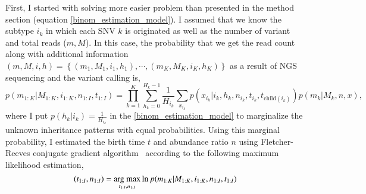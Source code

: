 \documentclass{article}
\begin{document}




First, I started with solving more easier problem than presented in the method section (equation \ref{binom_estimation_model}).
I assumed that we know the subtype $i_k$ in which each SNV $k$ is originated as well as the number of variant and total reads ($m, M$).
In this case, the probability that we get the read count along with additional information $(m,M,i,h) = \left\{(m_1, M_1, i_1, h_1), \cdots, (m_K, M_K, i_K, h_K) \right\}$ as a result of NGS sequencing and the variant calling is,
\begin{equation}
  p(m_{1:K}|M_{1:K}, i_{1:K}, n_{1:I}, t_{1:I}) = \prod_{k=1}^{K} \sum_{h_k=0}^{H_k-1} \frac{1}{H_{i_k}} \sum_{x_{i_k}} p(x_{i_k} | i_k, h_k, n_{i_k}, t_{i_k}, t_{\mathrm{child}(i_k)}) p (m_k | M_k, n, x),
\end{equation}
where I put $p(h_k | i_k) = \frac{1}{H_{i_k}}$ in the \eqref{binom_estimation_model} to marginalize the unknown inheritance patterns with equal probabilities.
Using this marginal probability, I estimated the birth time $t$ and abundance ratio $n$ using Fletcher-Reeves conjugate gradient algorithm~\cite{fletcher1964function} according to the following maximum likelihood estimation,
\begin{equation}
 (t_{1:I}, n_{1:I}) = \mathop{\rm arg~max}\limits_{t_{1:I}, n_{1:I}} \ln p(m_{1:K} | M_{1:K}, i_{1:K}, n_{1:I}, t_{1:I})
\end{equation}
\end{document}
